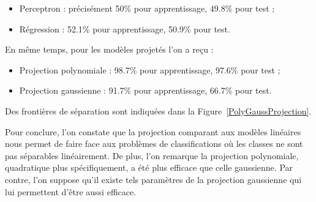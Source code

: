 \documentclass[a4paper,11pt]{article}
\theoremstyle{plain}
\theoremstyle{definition}
\begin{document}
\begin{itemize}
    \item Perceptron : précisément 50\%  pour apprentissage, 49.8\%  pour test ;
    \item Régression : 52.1\% pour apprentissage, 50.9\% pour test.
\end{itemize}
En même temps, pour les modèles projetés l'on a reçu :

\begin{itemize}
    \item Projection polynomiale : 98.7\%  pour apprentissage, 97.6\%  pour test ;
    \item Projection gaussienne : 91.7\% pour apprentissage, 66.7\% pour test.
\end{itemize}
Des frontières de séparation sont indiquées dans la Figure~\ref{PolyGaussProjection}.

Pour conclure, l'on constate que la projection comparant aux modèles linéaires nous permet de faire face aux problèmes de classifications où les classes ne sont pas séparables linéairement. De plus, l'on remarque la projection polynomiale, quadratique plus spécifiquement, a été plus efficace que celle gaussienne. Par contre, l'on suppose qu'il existe tels paramètres de la projection gaussienne qui lui permettent d'être aussi efficace.
\end{document}
